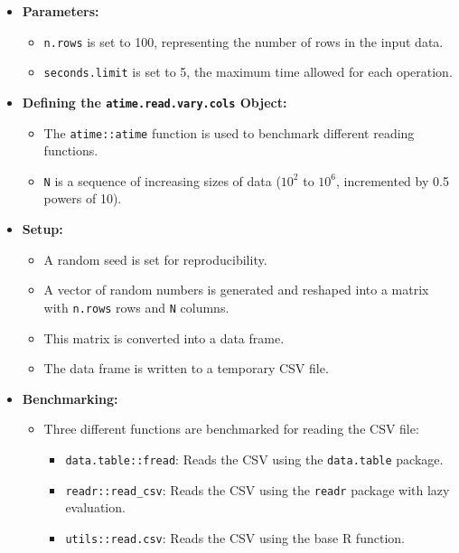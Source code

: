 \begin{itemize}
    \item \textbf{Parameters:}
    \begin{itemize}
        \item \texttt{n.rows} is set to 100, representing the number of rows in the input data.
        \item \texttt{seconds.limit} is set to 5, the maximum time allowed for each operation.
    \end{itemize}

    \item \textbf{Defining the \texttt{atime.read.vary.cols} Object:}
    \begin{itemize}
        \item The \texttt{atime::atime} function is used to benchmark different reading functions.
        \item \texttt{N} is a sequence of increasing sizes of data (\(10^2\) to \(10^6\), incremented by 0.5 powers of 10).
    \end{itemize}

    \item \textbf{Setup:}
    \begin{itemize}
        \item A random seed is set for reproducibility.
        \item A vector of random numbers is generated and reshaped into a matrix with \texttt{n.rows} rows and \texttt{N} columns.
        \item This matrix is converted into a data frame.
        \item The data frame is written to a temporary CSV file.
    \end{itemize}

    \item \textbf{Benchmarking:}
    \begin{itemize}
        \item Three different functions are benchmarked for reading the CSV file:
        \begin{itemize}
            \item \texttt{data.table::fread}: Reads the CSV using the \texttt{data.table} package.
            \item \texttt{readr::read\_csv}: Reads the CSV using the \texttt{readr} package with lazy evaluation.
            \item \texttt{utils::read.csv}: Reads the CSV using the base R function.
        \end{itemize}
    \end{itemize}
\end{itemize}

